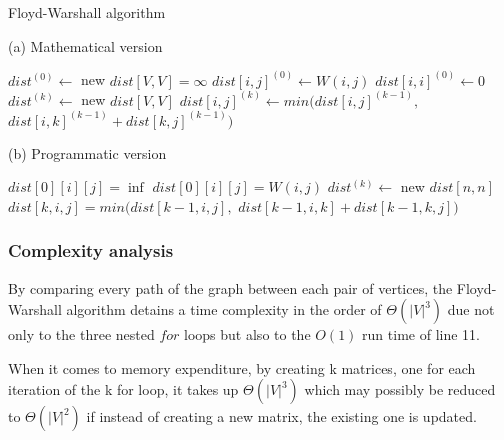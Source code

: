 \begin{algorithm}[ht]
    \caption{Floyd-Warshall algorithm}
    \label{alg:floyd-warshall}
    \begin{minipage}[t]{0.49\linewidth}
        (a) Mathematical version
        \begin{algorithmic}[1]
                    \State $dist^{(0)} \gets $ new $ dist[V, V] = \infty$
                        \State $dist[i,j]^{(0)} \gets W(i,j)$
                    \EndFor
                        \State $dist[i,i]^{(0)} \gets 0$
                    \EndFor
                    \State $dist^{(k)} \gets $ new $ dist[V, V]$
                            \State $dist[i,j]^{(k)} \gets min( dist[i,j]^{(k-1)},$
                            $dist[i,k]^{(k-1)} + dist[k,j]^{(k-1)} )$
                        \EndFor
                    \EndFor
                \EndFor
                \State {}
            \EndFunction
        \end{algorithmic}
    \end{minipage}
    \begin{minipage}[t]{0.49\linewidth}
        (b) Programmatic version
        \begin{algorithmic}[1]
                        \State $dist[0][i][j] = \inf$
                            \State $dist[0][i][j] = W(i,j)$
                        \EndIf
                    \EndFor
                \EndFor
                    \State $dist^{(k)} \gets $ new $ dist[n, n]$
                            \State $dist[k,i,j] = min(dist[k-1,i,j],$
                            $dist[k-1,i,k] + dist[k-1,k,j])$
                        \EndFor
                    \EndFor
                \EndFor
                \State {}
            \EndFunction
        \end{algorithmic}
    \end{minipage}
\end{algorithm}

\subsubsection{Complexity analysis}
By comparing every path of the graph between each pair of vertices, the Floyd-Warshall algorithm detains a time complexity in the order of $\Theta(|V|^3)$ due not only to the three nested $for$ loops but also to the $O(1)$ run time of line 11.\par
When it comes to memory expenditure, by creating k matrices, one for each iteration of the k for loop, it takes up $\Theta(|V|^3)$ which may possibly be reduced to $\Theta(|V|^2)$ if instead of creating a new matrix, the existing one is updated.

